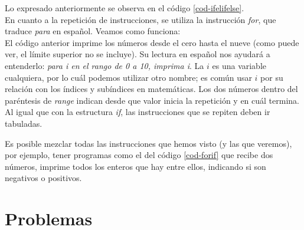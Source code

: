Lo expresado anteriormente se observa en el código \ref{cod-ifelifelse}.  \\



En cuanto a la repetición de instrucciones, se utiliza la instrucción \emph{for}, que traduce \emph{para} en español. Veamos como funciona: \\



El código anterior imprime los números desde el cero hasta el nueve (como puede ver, el límite superior no se incluye). Su lectura en español nos ayudará a entenderlo: \emph{para i en el rango de 0 a 10, imprima i}. La $i$ es una variable cualquiera, por lo cuál podemos utilizar otro nombre; es común usar $i$ por su relación con los índices y subíndices en matemáticas. Los dos números dentro del paréntesis de \emph{range} indican desde que valor inicia la repetición y en cuál termina. Al igual que con la estructura \emph{if}, las instrucciones que se repiten deben ir tabuladas.

Es posible mezclar todas las instrucciones que hemos visto (y las que veremos), por ejemplo, tener programas como el del código \ref{cod-forif} que recibe dos números, imprime todos los enteros que hay entre ellos, indicando si son negativos o positivos.






\section{Problemas}



\newpage